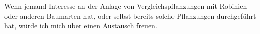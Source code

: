 \documentclass[twocolumn]{scrartcl}
\begin{document}
Wenn jemand Interesse an der Anlage von Vergleichspflanzungen mit Robinien oder anderen Baumarten hat, oder selbst bereits solche Pflanzungen durchgeführt hat, würde ich mich über einen Austausch freuen.


%
\printbibliography

\end{document}
